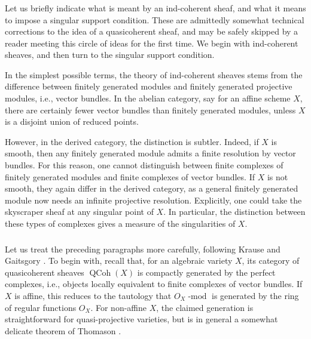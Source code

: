 \documentclass[10pt]{amsart}
\newcommand{\on}{\operatorname}
\renewcommand{\mod}{\on{-mod}}
\theoremstyle{remark}
\numberwithin{equation}{section}
\renewcommand{\mod}{\operatorname{-mod}}
\newcommand{\QCoh}{\on{QCoh}}
\begin{document}
\subsubsection{} Let us briefly indicate what is meant by an ind-coherent sheaf, and what it means to impose a singular support condition. These are
admittedly somewhat technical corrections to the idea of a quasicoherent sheaf, and may be safely skipped by a reader meeting 
this circle of ideas for the first time. We begin with ind-coherent sheaves, 
and then turn to the singular support 
condition. 

In the simplest possible terms, the theory of ind-coherent sheaves 
stems from the difference between finitely generated modules and finitely 
generated projective modules, i.e., vector bundles. In the abelian category, say 
for an affine scheme $X$, there are certainly fewer vector bundles than finitely 
generated modules, unless $X$ is a 
disjoint union of reduced points. 


However,  in the derived category, the distinction is subtler. Indeed, if $X$ 
is smooth, then any  finitely generated module admits a finite resolution by 
vector bundles. For this reason, one cannot distinguish between finite 
complexes of finitely generated modules and finite complexes of vector bundles. 
If $X$ is not 
smooth, they again differ in the derived category, as a general finitely generated module now needs an infinite projective resolution. Explicitly, one could take the skyscraper sheaf at any singular point of $X$. In particular, the distinction between these types of complexes gives a measure of 
the singularities of $X$.    







\subsubsection{}Let us treat the preceding paragraphs more carefully, following Krause \cite{krause} and Gaitsgory \cite{gaitsgoryindcoh}. To begin 
with, recall that, for an algebraic variety $X$, its category of 
quasicoherent sheaves $\QCoh(X)$ is compactly generated by the perfect 
complexes, i.e., objects locally equivalent to finite complexes of vector 
bundles. If $X$ 
is affine, this reduces to the tautology that $O_X\mod$ is generated by the ring of 
regular functions $O_X$. For non-affine $X$, the claimed generation is 
straightforward for quasi-projective varieties, but is in general a somewhat delicate 
theorem of Thomason \cite{thomasontrobaugh}. 
\end{document}
